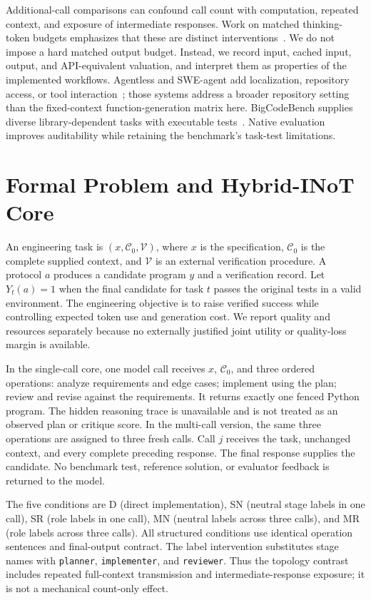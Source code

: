 Additional-call comparisons can confound call count with computation, repeated context, and exposure of intermediate responses. Work on matched thinking-token budgets emphasizes that these are distinct interventions~\cite{tran2026budget}. We do not impose a hard matched output budget. Instead, we record input, cached input, output, and API-equivalent valuation, and interpret them as properties of the implemented workflows. Agentless and SWE-agent add localization, repository access, or tool interaction~\cite{xia2024agentless,yang2024sweagent}; those systems address a broader repository setting than the fixed-context function-generation matrix here. BigCodeBench supplies diverse library-dependent tasks with executable tests~\cite{zhuo2024bigcodebench}. Native evaluation improves auditability while retaining the benchmark's task-test limitations.

\section{Formal Problem and Hybrid-INoT Core}
An engineering task is $(x,\mathcal{C}_0,\mathcal{V})$, where $x$ is the specification, $\mathcal{C}_0$ is the complete supplied context, and $\mathcal{V}$ is an external verification procedure. A protocol $a$ produces a candidate program $y$ and a verification record. Let $Y_t(a)=1$ when the final candidate for task $t$ passes the original tests in a valid environment. The engineering objective is to raise verified success while controlling expected token use and generation cost. We report quality and resources separately because no externally justified joint utility or quality-loss margin is available.

In the single-call core, one model call receives $x$, $\mathcal{C}_0$, and three ordered operations: analyze requirements and edge cases; implement using the plan; review and revise against the requirements. It returns exactly one fenced Python program. The hidden reasoning trace is unavailable and is not treated as an observed plan or critique score. In the multi-call version, the same three operations are assigned to three fresh calls. Call $j$ receives the task, unchanged context, and every complete preceding response. The final response supplies the candidate. No benchmark test, reference solution, or evaluator feedback is returned to the model.

The five conditions are D (direct implementation), SN (neutral stage labels in one call), SR (role labels in one call), MN (neutral labels across three calls), and MR (role labels across three calls). All structured conditions use identical operation sentences and final-output contract. The label intervention substitutes stage names with \texttt{planner}, \texttt{implementer}, and \texttt{reviewer}. Thus the topology contrast includes repeated full-context transmission and intermediate-response exposure; it is not a mechanical count-only effect.

